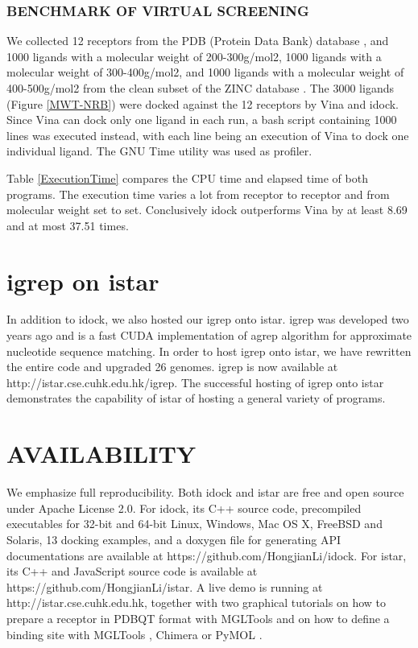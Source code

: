 \documentclass[12pt]{article}
\begin{document}
\subsubsection*{\sffamily \normalsize BENCHMARK OF VIRTUAL SCREENING}

We collected 12 receptors from the PDB (Protein Data Bank) database \cite{540,537}, and 1000 ligands with a molecular weight of 200-300g/mol2, 1000 ligands with a molecular weight of 300-400g/mol2, and 1000 ligands with a molecular weight of 400-500g/mol2 from the clean subset of the ZINC database \cite{532,1178}. The 3000 ligands (Figure \ref{MWT-NRB}) were docked against the 12 receptors by Vina and idock. Since Vina can dock only one ligand in each run, a bash script containing 1000 lines was executed instead, with each line being an execution of Vina to dock one individual ligand. The GNU Time utility was used as profiler.

Table \ref{ExecutionTime} compares the CPU time and elapsed time of both programs. The execution time varies a lot from receptor to receptor and from molecular weight set to set. Conclusively idock outperforms Vina by at least 8.69 and at most 37.51 times.

\section*{\sffamily \Large igrep on istar}

In addition to idock, we also hosted our igrep \citep{1138} onto istar. igrep was developed two years ago and is a fast CUDA implementation of agrep algorithm for approximate nucleotide sequence matching. In order to host igrep onto istar, we have rewritten the entire code and upgraded 26 genomes. igrep is now available at http://istar.cse.cuhk.edu.hk/igrep. The successful hosting of igrep onto istar demonstrates the capability of istar of hosting a general variety of programs.

\section*{\sffamily \Large AVAILABILITY}

We emphasize full reproducibility. Both idock and istar are free and open source under Apache License 2.0. For idock, its C++ source code, precompiled executables for 32-bit and 64-bit Linux, Windows, Mac OS X, FreeBSD and Solaris, 13 docking examples, and a doxygen file for generating API documentations are available at https://github.com/HongjianLi/idock. For istar, its C++ and JavaScript source code is available at https://github.com/HongjianLi/istar. A live demo is running at http://istar.cse.cuhk.edu.hk, together with two graphical tutorials on how to prepare a receptor in PDBQT format with MGLTools \citep{596} and on how to define a binding site with MGLTools \citep{596}, Chimera \citep{1219} or PyMOL \citep{1221}.
\end{document}

